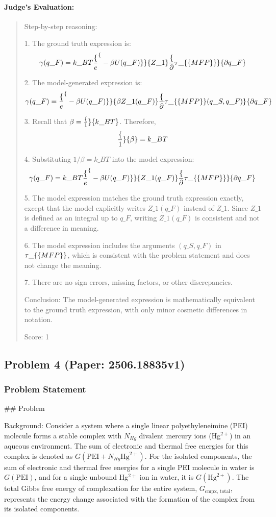 \documentclass[10pt]{article}
\begin{document}
\paragraph*{Judge's Evaluation:}
\begin{quote}\ttfamily Step-by-step reasoning:

1. The ground truth expression is:
   \[
   \gamma(q\_F) = k\_B T \frac\{e^\{-\beta U(q\_F)\}\}\{Z\_1\} \frac\{\partial \tau\_\{\mathrm\{MFP\}\}\}\{\partial q\_F\}
   \]

2. The model-generated expression is:
   \[
   \gamma(q\_F) = \frac\{e^\{-\beta U(q\_F)\}\}\{\beta Z\_1(q\_F)\} \frac\{\partial \tau\_\{\mathrm\{MFP\}\}(q\_S,q\_F)\}\{\partial q\_F\}
   \]

3. Recall that \(\beta = \frac\{1\}\{k\_B T\}\). Therefore,
   \[
   \frac\{1\}\{\beta\} = k\_B T
   \]

4. Substituting \(1/\beta = k\_B T\) into the model expression:
   \[
   \gamma(q\_F) = k\_B T \frac\{e^\{-\beta U(q\_F)\}\}\{Z\_1(q\_F)\} \frac\{\partial \tau\_\{\mathrm\{MFP\}\}\}\{\partial q\_F\}
   \]

5. The model expression matches the ground truth expression exactly, except that the model explicitly writes \(Z\_1(q\_F)\) instead of \(Z\_1\). Since \(Z\_1\) is defined as an integral up to \(q\_F\), writing \(Z\_1(q\_F)\) is consistent and not a difference in meaning.

6. The model expression includes the arguments \((q\_S, q\_F)\) in \(\tau\_\{\mathrm\{MFP\}\}\), which is consistent with the problem statement and does not change the meaning.

7. There are no sign errors, missing factors, or other discrepancies.

Conclusion: The model-generated expression is mathematically equivalent to the ground truth expression, with only minor cosmetic differences in notation.

Score: 1\end{quote}

\newpage
\subsection*{Problem 4 (Paper: 2506.18835v1)}
\subsubsection*{Problem Statement}
## Problem

Background:
Consider a system where a single linear polyethyleneimine (PEI) molecule forms a stable complex with $N_{Hg}$ divalent mercury ions (Hg$^{2+}$) in an aqueous environment. The sum of electronic and thermal free energies for this complex is denoted as $G(\text{PEI} + N_{Hg}\text{Hg}^{2+})$. For the isolated components, the sum of electronic and thermal free energies for a single PEI molecule in water is $G(\text{PEI})$, and for a single unbound Hg$^{2+}$ ion in water, it is $G(\text{Hg}^{2+})$. The total Gibbs free energy of complexation for the entire system, $G_{\text{cmpx, total}}$, represents the energy change associated with the formation of the complex from its isolated components.
\end{document}

